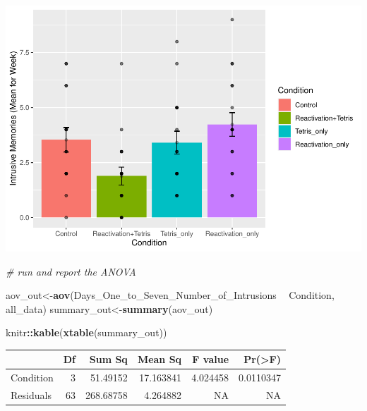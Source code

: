 \documentclass[]{book}
\newenvironment{Shaded}{\begin{snugshade}}{\end{snugshade}}
\newcommand{\KeywordTok}[1]{\textcolor[rgb]{0.13,0.29,0.53}{\textbf{#1}}}
\newcommand{\DataTypeTok}[1]{\textcolor[rgb]{0.13,0.29,0.53}{#1}}
\newcommand{\StringTok}[1]{\textcolor[rgb]{0.31,0.60,0.02}{#1}}
\newcommand{\CommentTok}[1]{\textcolor[rgb]{0.56,0.35,0.01}{\textit{#1}}}
\newcommand{\OtherTok}[1]{\textcolor[rgb]{0.56,0.35,0.01}{#1}}
\newcommand{\OperatorTok}[1]{\textcolor[rgb]{0.81,0.36,0.00}{\textbf{#1}}}
\newcommand{\NormalTok}[1]{#1}
\begin{document}
\includegraphics{Statistics_Lab_files/figure-latex/unnamed-chunk-239-1.pdf}

\begin{Shaded}
\begin{Highlighting}[]
\CommentTok{# run and report the ANOVA}

\NormalTok{aov_out<-}\KeywordTok{aov}\NormalTok{(Days_One_to_Seven_Number_of_Intrusions }\OperatorTok{~}\StringTok{ }\NormalTok{Condition, all_data)}
\NormalTok{summary_out<-}\KeywordTok{summary}\NormalTok{(aov_out)}

\NormalTok{knitr}\OperatorTok{::}\KeywordTok{kable}\NormalTok{(}\KeywordTok{xtable}\NormalTok{(summary_out))}
\end{Highlighting}
\end{Shaded}

\begin{tabular}{l|r|r|r|r|r}
\hline
  & Df & Sum Sq & Mean Sq & F value & Pr(>F)\\
\hline
Condition & 3 & 51.49152 & 17.163841 & 4.024458 & 0.0110347\\
\hline
Residuals & 63 & 268.68758 & 4.264882 & NA & NA\\
\hline
\end{tabular}

\begin{Shaded}
\end{Shaded}
\end{document}
